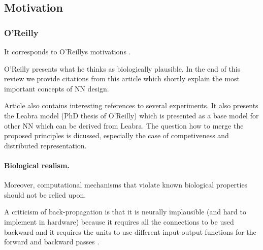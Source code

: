 




\subsection*{Motivation}

\subsubsection{O'Reilly} 
It corresponds to O'Reillys motivations \cite{o1998six}.

O'Reilly presents what he thinks as biologically plausible. In the end of this review we provide citations from this article which shortly explain the most important concepts of NN design. 

Article also contains interesting references to several experiments. It also presents the Leabra model (PhD thesis of O'Reilly) which is presented as a base model for other NN which can be derived from Leabra. The question how to merge the proposed principles is dicussed, especially the case of competiveness and distributed representation. 

\paragraph{Biological realism.} Moreover, computational mechanisms that violate
known biological properties should not be relied upon. 

A criticism of back-propagation is that it is neurally implausible (and hard to implement in hardware) because it requires all the connections to be used backward and it requires the units to use different input-output functions for the forward and backward passes \cite{hinton1988learning}.


